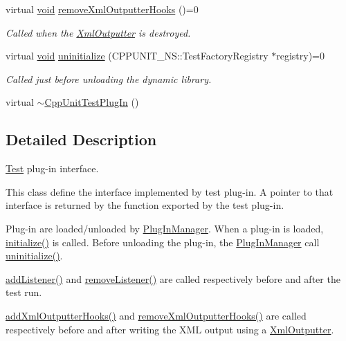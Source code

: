 \begin{DoxyCompactItemize}
virtual \hyperlink{wglew_8h_aeea6e3dfae3acf232096f57d2d57f084}{void} \hyperlink{struct_cpp_unit_test_plug_in_a045727ad9658525838b0b9157065fbcd}{remove\-Xml\-Outputter\-Hooks} ()=0
\begin{DoxyCompactList}\small\item\em Called when the \hyperlink{class_xml_outputter}{Xml\-Outputter} is destroyed. \end{DoxyCompactList}\item 
virtual \hyperlink{wglew_8h_aeea6e3dfae3acf232096f57d2d57f084}{void} \hyperlink{struct_cpp_unit_test_plug_in_a8628d2026e76c58f715e17af88f77458}{uninitialize} (C\-P\-P\-U\-N\-I\-T\-\_\-\-N\-S\-::\-Test\-Factory\-Registry $\ast$registry)=0
\begin{DoxyCompactList}\small\item\em Called just before unloading the dynamic library. \end{DoxyCompactList}\item 
virtual \hyperlink{struct_cpp_unit_test_plug_in_a62e68f9d54b9791f1f3556fb8df2af6a}{$\sim$\-Cpp\-Unit\-Test\-Plug\-In} ()
\end{DoxyCompactItemize}


\subsection{Detailed Description}
\hyperlink{class_test}{Test} plug-\/in interface.

This class define the interface implemented by test plug-\/in. A pointer to that interface is returned by the function exported by the test plug-\/in. 

Plug-\/in are loaded/unloaded by \hyperlink{class_plug_in_manager}{Plug\-In\-Manager}. When a plug-\/in is loaded, \hyperlink{struct_cpp_unit_test_plug_in_aec670330e7fced26c2a66b1dcd56edc0}{initialize()} is called. Before unloading the plug-\/in, the \hyperlink{class_plug_in_manager}{Plug\-In\-Manager} call \hyperlink{struct_cpp_unit_test_plug_in_a8628d2026e76c58f715e17af88f77458}{uninitialize()}.

\hyperlink{struct_cpp_unit_test_plug_in_aad8038dc72d0f9798379937fe5692c97}{add\-Listener()} and \hyperlink{struct_cpp_unit_test_plug_in_a8f36157014b515d38efbc8ab67923d85}{remove\-Listener()} are called respectively before and after the test run.

\hyperlink{struct_cpp_unit_test_plug_in_a547cfddd0513dc9182721f723e27d9e3}{add\-Xml\-Outputter\-Hooks()} and \hyperlink{struct_cpp_unit_test_plug_in_a045727ad9658525838b0b9157065fbcd}{remove\-Xml\-Outputter\-Hooks()} are called respectively before and after writing the X\-M\-L output using a \hyperlink{class_xml_outputter}{Xml\-Outputter}.

